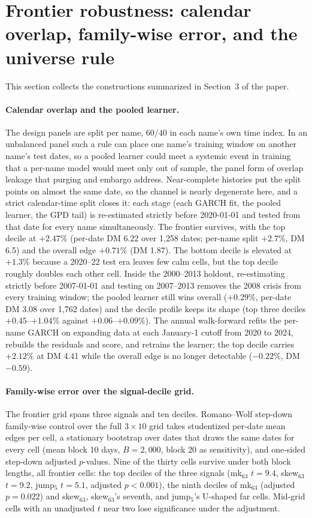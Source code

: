 \documentclass[11pt]{article}
\begin{document}
\section{Frontier robustness: calendar overlap, family-wise error, and the universe rule}
This section collects the constructions summarized in Section~3 of the paper.

\paragraph{Calendar overlap and the pooled learner.} The design panels are split per name, $60/40$ in each name's own time index. In an unbalanced panel such a rule can place one name's training window on another name's test dates, so a pooled learner could meet a systemic event in training that a per-name model would meet only out of sample, the panel form of overlap leakage that purging and embargo address. Near-complete histories put the split points on almost the same date, so the channel is nearly degenerate here, and a strict calendar-time split closes it: each stage (each GARCH fit, the pooled learner, the GPD tail) is re-estimated strictly before 2020-01-01 and tested from that date for every name simultaneously. The frontier survives, with the top decile at $+2.47\%$ (per-date DM 6.22 over 1{,}258 dates; per-name split $+2.7\%$, DM 6.5) and the overall edge $+0.71\%$ (DM 1.87). The bottom decile is elevated at $+1.3\%$ because a 2020--22 test era leaves few calm cells, but the top decile roughly doubles each other cell. Inside the 2000--2013 holdout, re-estimating strictly before 2007-01-01 and testing on 2007--2013 removes the 2008 crisis from every training window; the pooled learner still wins overall ($+0.29\%$, per-date DM 3.08 over 1{,}762 dates) and the decile profile keeps its shape (top three deciles $+0.45$--$+1.04\%$ against $+0.06$--$+0.09\%$). The annual walk-forward refits the per-name GARCH on expanding data at each January-1 cutoff from 2020 to 2024, rebuilds the residuals and score, and retrains the learner; the top decile carries $+2.12\%$ at DM 4.41 while the overall edge is no longer detectable ($-0.22\%$, DM $-0.59$).

\paragraph{Family-wise error over the signal-decile grid.} The frontier grid spans three signals and ten deciles. Romano--Wolf step-down family-wise control over the full $3\times10$ grid takes studentized per-date mean edges per cell, a stationary bootstrap over dates that draws the same dates for every cell (mean block 10 days, $B=2{,}000$, block 20 as sensitivity), and one-sided step-down adjusted $p$-values. Nine of the thirty cells survive under both block lengths, all frontier cells: the top deciles of the three signals (mk$_{63}$ $t=9.4$, skew$_{63}$ $t=9.2$, jump$_5$ $t=5.1$, adjusted $p<0.001$), the ninth deciles of mk$_{63}$ (adjusted $p=0.022$) and skew$_{63}$, skew$_{63}$'s seventh, and jump$_5$'s U-shaped far cells. Mid-grid cells with an unadjusted $t$ near two lose significance under the adjustment.
\end{document}
